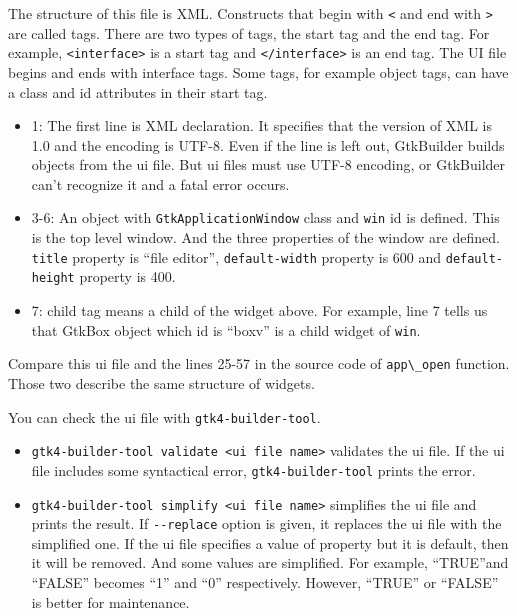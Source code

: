 The structure of this file is XML. Constructs that begin with
\passthrough{\lstinline!<!} and end with \passthrough{\lstinline!>!} are
called tags. There are two types of tags, the start tag and the end tag.
For example, \passthrough{\lstinline!<interface>!} is a start tag and
\passthrough{\lstinline!</interface>!} is an end tag. The UI file begins
and ends with interface tags. Some tags, for example object tags, can
have a class and id attributes in their start tag.

\begin{itemize}
\tightlist
\item
  1: The first line is XML declaration. It specifies that the version of
  XML is 1.0 and the encoding is UTF-8. Even if the line is left out,
  GtkBuilder builds objects from the ui file. But ui files must use
  UTF-8 encoding, or GtkBuilder can't recognize it and a fatal error
  occurs.
\item
  3-6: An object with \passthrough{\lstinline!GtkApplicationWindow!}
  class and \passthrough{\lstinline!win!} id is defined. This is the top
  level window. And the three properties of the window are defined.
  \passthrough{\lstinline!title!} property is ``file editor'',
  \passthrough{\lstinline!default-width!} property is 600 and
  \passthrough{\lstinline!default-height!} property is 400.
\item
  7: child tag means a child of the widget above. For example, line 7
  tells us that GtkBox object which id is ``boxv'' is a child widget of
  \passthrough{\lstinline!win!}.
\end{itemize}

Compare this ui file and the lines 25-57 in the source code of
\passthrough{\lstinline!app\_open!} function. Those two describe the
same structure of widgets.

You can check the ui file with
\passthrough{\lstinline!gtk4-builder-tool!}.

\begin{itemize}
\tightlist
\item
  \passthrough{\lstinline!gtk4-builder-tool validate <ui file name>!}
  validates the ui file. If the ui file includes some syntactical error,
  \passthrough{\lstinline!gtk4-builder-tool!} prints the error.
\item
  \passthrough{\lstinline!gtk4-builder-tool simplify <ui file name>!}
  simplifies the ui file and prints the result. If
  \passthrough{\lstinline!--replace!} option is given, it replaces the
  ui file with the simplified one. If the ui file specifies a value of
  property but it is default, then it will be removed. And some values
  are simplified. For example, ``TRUE''and ``FALSE'' becomes ``1'' and
  ``0'' respectively. However, ``TRUE'' or ``FALSE'' is better for
  maintenance.
\end{itemize}

